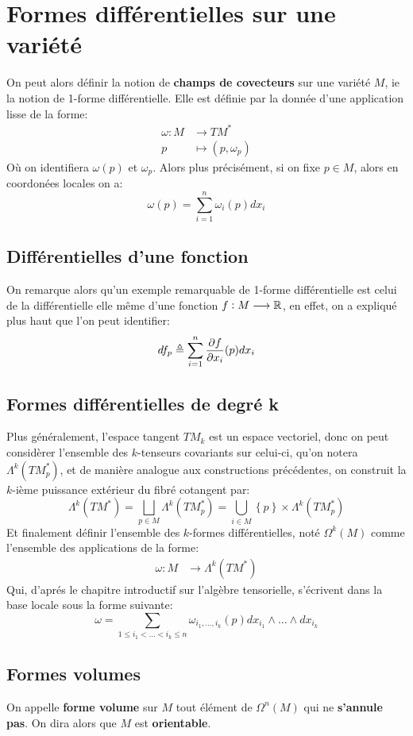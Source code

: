 \chapter{Formes différentielles sur une variété}
On peut alors définir la notion de \textbf{champs de covecteurs} sur une variété \( M \), ie la notion de 1-forme différentielle. Elle est définie par la donnée d'une application lisse de la forme:
\[ 
   \begin{aligned}
      \omega : M &\longrightarrow TM^* \\
      p &\longmapsto (p, \omega_p)
   \end{aligned} 
\]
Où on identifiera \( \omega(p) \) et \(\omega_p\). Alors plus précisément, si on fixe \( p \in M \), alors en coordonées locales on a:
\[ 
   \omega(p) = \sum_{i = 1}^n \omega_i(p) dx_i
\]
\section{Différentielles d'une fonction}
On remarque alors qu'un exemple remarquable de 1-forme différentielle est celui de la différentielle elle même d'une fonction \( f : M \longrightarrow \mathbb{R} \), en effet, on a expliqué plus haut que l'on peut identifier:
\[ 
   df_p \triangleq  \sum_{i=1}^n \frac{\partial f}{\partial x_i}(p)dx_i
\]
\section{Formes différentielles de degré k}
Plus généralement, l'espace tangent \( TM_k \) est un espace vectoriel, donc on peut considèrer l'ensemble des \( k \)-tenseurs covariants sur celui-ci, qu'on notera \( \Lambda^k(TM_p^*) \), et de manière analogue aux constructions précédentes, on construit la \( k \)-ième puissance extérieur du fibré cotangent par:
\[ 
   \Lambda^k(TM^*) = \bigsqcup_{p \in M} \Lambda^k(TM_p^*) = \bigcup_{i \in M} \left\{ p \right\} \times \Lambda^k(TM_p^*) 
\]
Et finalement définir l'ensemble des \( k \)-formes différentielles, noté \( \Omega^k(M) \) comme l'ensemble des applications de la forme:
\[ 
   \begin{aligned}
      \omega : M &\longrightarrow \Lambda^k(TM^*)
   \end{aligned} 
\]
Qui, d'aprés le chapitre introductif sur l'algèbre tensorielle, s'écrivent dans la base locale sous la forme suivante:
\[ 
   \omega = \sum_{1 \leq i_1 < \ldots < i_k \leq n} \omega_{i_1, \ldots, i_k}(p) dx_{i_1} \wedge \ldots \wedge dx_{i_k}
\]
\section{Formes volumes}
On appelle \textbf{forme volume} sur \( M \) tout élément de \( \Omega^n(M) \) qui ne \textbf{s'annule pas}. On dira alors que \( M \) est \textbf{orientable}.


